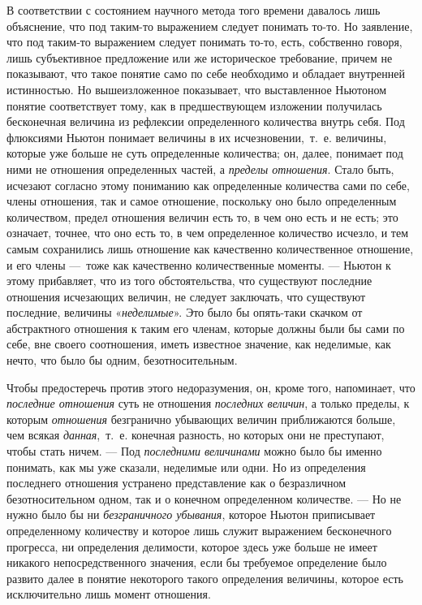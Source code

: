 {В соответствии с состоянием научного метода того времени давалось лишь
объяснение, что под таким-то выражением следует понимать то-то. Но
заявление, что под таким-то выражением следует понимать то-то, есть,
собственно говоря, лишь субъективное предложение или же историческое
требование, причем не показывают, что такое понятие само по себе необходимо
и обладает внутренней истинностью. Но вышеизложенное показывает, что
выставленное Ньютоном понятие соответствует тому, как в предшествующем
изложении получилась бесконечная величина из рефлексии определенного
количества внутрь себя. Под флюксиями Ньютон понимает величины в их
исчезновении,~т.~е. величины, которые уже больше не суть определенные
количества; он, далее, понимает под ними не отношения определенных частей,
а {\em пределы отношения}. Стало быть, исчезают
согласно этому пониманию как определенные количества сами по себе, члены
отношения, так и самое отношение, поскольку оно было определенным
количеством, предел отношения величин есть то, в чем оно есть и не есть;
это означает, точнее, что оно есть то, в чем определенное количество
исчезло, и тем самым сохранились лишь отношение как качественно
количественное отношение, и его члены —~тоже как качественно количественные
моменты. — Ньютон к этому прибавляет, что из того обстоятельства, что
существуют последние отношения исчезающих величин, не следует заключать,
что существуют последние, величины «{\em неделимые}».
Это было бы опять-таки скачком от абстрактного отношения к таким его
членам, которые должны были бы сами по себе, вне своего соотношения, иметь
известное значение, как неделимые, как нечто, что было бы одним,
безотносительным.

Чтобы предостеречь против этого недоразумения, он, кроме того, напоминает,
что {\em последние отношения} суть не отношения
{\em последних величин}, а только пределы, к которым
{\em отношения} безгранично убывающих величин
приближаются больше, чем всякая {\em данная},~т.~е.
конечная разность, но которых они не преступают, чтобы стать ничем. — Под
{\em последними величинами} можно было бы именно
понимать, как мы уже сказали, неделимые или одни. Но из определения
последнего отношения устранено представление как о безразличном
безотносительном одном, так и о конечном определенном количестве. — Но не
нужно было бы ни {\em безграничного убывания}, которое
Ньютон приписывает определенному количеству и которое лишь служит
выражением бесконечного прогресса, ни определения делимости, которое здесь
уже больше не имеет никакого непосредственного значения, если бы требуемое
определение было развито далее в понятие некоторого такого определения
величины, которое есть исключительно лишь момент отношения.

}
